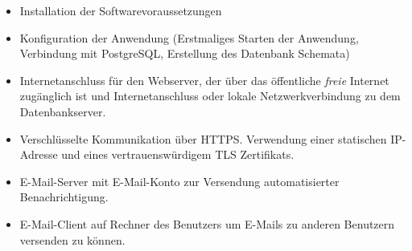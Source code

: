 \begin{itemize}
	\item Installation der Softwarevoraussetzungen

	\item Konfiguration der Anwendung (Erstmaliges Starten der Anwendung, Verbindung mit PostgreSQL, Erstellung des Datenbank Schemata)

	\item Internetanschluss für den Webserver, der über das öffentliche \textit{freie} Internet zugänglich ist und Internetanschluss oder lokale Netzwerkverbindung zu dem Datenbankserver.

	\item Verschlüsselte Kommunikation über HTTPS. Verwendung einer statischen IP-Adresse und eines vertrauenswürdigem TLS Zertifikats.

	\item E-Mail-Server mit E-Mail-Konto zur Versendung automatisierter Benachrichtigung.

	\item E-Mail-Client auf Rechner des Benutzers um E-Mails zu anderen Benutzern versenden zu können.
\end{itemize}


